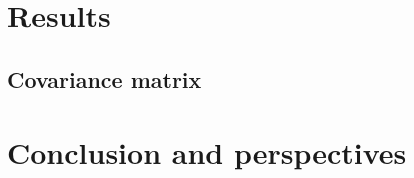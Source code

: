 \documentclass[../main.tex]{subfiles}
\begin{document}
\section{Results}
\label{sec:joint_fit:results}
%
%
%
%
%
%
\subsection{Covariance matrix}
\label{sec:joint_fit:cov_mat}

%
%
%
%
%

\section{Conclusion and perspectives}
\label{sec:joint_fit:conclusion}
\end{document}

